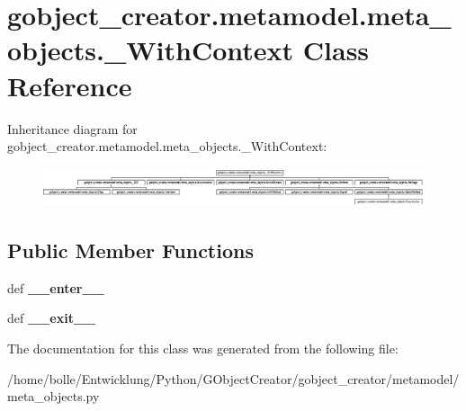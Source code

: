 \hypertarget{classgobject__creator_1_1metamodel_1_1meta__objects_1_1__WithContext}{
\section{gobject\_\-creator.metamodel.meta\_\-objects.\_\-WithContext Class Reference}
\label{classgobject__creator_1_1metamodel_1_1meta__objects_1_1__WithContext}
}
Inheritance diagram for gobject\_\-creator.metamodel.meta\_\-objects.\_\-WithContext:\begin{figure}[H]
\begin{center}
\leavevmode
\includegraphics[height=1.14519cm]{classgobject__creator_1_1metamodel_1_1meta__objects_1_1__WithContext}
\end{center}
\end{figure}
\subsection*{Public Member Functions}
\begin{DoxyCompactItemize}
\item 
\hypertarget{classgobject__creator_1_1metamodel_1_1meta__objects_1_1__WithContext_ad4650a1f7f0f6982edb21a53e99ba061}{
def {\bfseries \_\-\_\-enter\_\-\_\-}}
\label{classgobject__creator_1_1metamodel_1_1meta__objects_1_1__WithContext_ad4650a1f7f0f6982edb21a53e99ba061}

\item 
\hypertarget{classgobject__creator_1_1metamodel_1_1meta__objects_1_1__WithContext_aff6444270a6ade44769e83440f00149d}{
def {\bfseries \_\-\_\-exit\_\-\_\-}}
\label{classgobject__creator_1_1metamodel_1_1meta__objects_1_1__WithContext_aff6444270a6ade44769e83440f00149d}

\end{DoxyCompactItemize}


The documentation for this class was generated from the following file:\begin{DoxyCompactItemize}
\item 
/home/bolle/Entwicklung/Python/GObjectCreator/gobject\_\-creator/metamodel/meta\_\-objects.py\end{DoxyCompactItemize}
